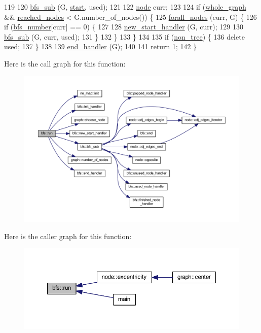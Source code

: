 \begin{DoxyCode}
119 
120     \mbox{\hyperlink{classbfs_a567815d3b63e802420f4b536749a1ad2}{bfs\_sub}} (G, \mbox{\hyperlink{classbfs_af2ab561d9e60a9fc2e25b02d1f807f96}{start}}, used);
121 
122     \mbox{\hyperlink{classnode}{node}} curr;
123 
124     \textcolor{keywordflow}{if} (\mbox{\hyperlink{classbfs_a6c08fbcc90d71f1cbdd03a1cdaa9dc99}{whole\_graph}} && \mbox{\hyperlink{classbfs_ac3db80b59d5db049199936445a6c2da8}{reached\_nodes}} < G.number\_of\_nodes()) \{
125     \mbox{\hyperlink{graph_8h_a1905bf4c6aa7167b9ee5a2e72f12ad2d}{forall\_nodes}} (curr, G) \{
126         \textcolor{keywordflow}{if} (\mbox{\hyperlink{classbfs_a59d0c5c5ad2715776b20b1aec03dbc3a}{bfs\_number}}[curr] == 0) \{
127 
128         \mbox{\hyperlink{classbfs_ab89a3d1cb36b20a86837b0345063e4b1}{new\_start\_handler}} (G, curr);
129 
130         \mbox{\hyperlink{classbfs_a567815d3b63e802420f4b536749a1ad2}{bfs\_sub}} (G, curr, used);
131         \}
132     \}
133     \}
134 
135     \textcolor{keywordflow}{if} (\mbox{\hyperlink{classbfs_a056b2131db11e62eb8f41c8dcc117d2e}{non\_tree}}) \{
136     \textcolor{keyword}{delete} used;
137     \}
138 
139     \mbox{\hyperlink{classbfs_adbabb41ab56b92606fe7b53f346142ed}{end\_handler}} (G);
140 
141     \textcolor{keywordflow}{return} 1;
142 \}
\end{DoxyCode}
Here is the call graph for this function\+:
\nopagebreak
\begin{figure}[H]
\begin{center}
\leavevmode
\includegraphics[width=350pt]{classbfs_a06ae16bd0f3bb2f8eb6b3e36659ba82e_cgraph}
\end{center}
\end{figure}
Here is the caller graph for this function\+:
\nopagebreak
\begin{figure}[H]
\begin{center}
\leavevmode
\includegraphics[width=350pt]{classbfs_a06ae16bd0f3bb2f8eb6b3e36659ba82e_icgraph}
\end{center}
\end{figure}
